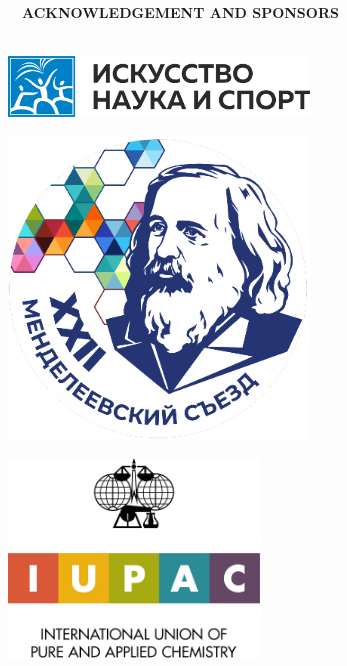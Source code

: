 {\begin{minipage}[t][1.8cm]{0.32\textwidth}
  \end{minipage}
  \hfill\color{skgreen}{\vline width 1pt}\hfill
  \begin{minipage}[t][1.8cm]{.32\textwidth}
	\hspace{0.25cm}
	$\quad$\textbf{\centering\small\color{skgreen}ACKNOWLEDGEMENT AND SPONSORS}\\$\;$\\
	\footnotesize
	\begin{minipage}{.32\textwidth}
	  \begin{center}
        \vspace*{-0.75cm}
		\includegraphics[width=0.60\textwidth]{logos/artscienceandsport_logo.png}
	  \end{center}
	\end{minipage}
	\begin{minipage}{.32\textwidth}
	  \begin{center}
	    \includegraphics[width=0.60\textwidth]{logos/conf_logo.png}
	  \end{center}
	\end{minipage}
        \begin{minipage}{.32\textwidth}
        \vspace*{-0.5cm}
	  \begin{center}
        \includegraphics[width=0.50\textwidth]{logos/lupac_logo_transparente.png}
	  \end{center}
	\end{minipage}
 

\end{minipage}}
